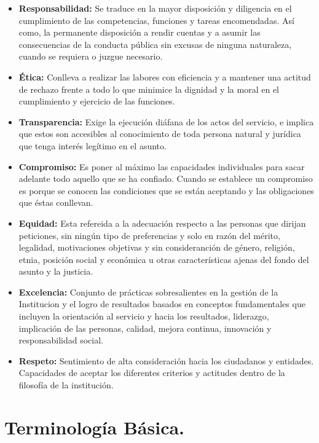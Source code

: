 \documentclass[]{article}
\providecommand{\tightlist}{%
  \setlength{\itemsep}{0pt}\setlength{\parskip}{0pt}}
\begin{document}
\begin{itemize}
\tightlist
\item
  \textbf{Responsabilidad:} Se traduce en la mayor disposición y
  diligencia en el cumplimiento de las competencias, funciones y tareas
  encomendadas. Así como, la permanente disposición a rendir cuentas y a
  asumir las consecuencias de la conducta pública sin excusas de ninguna
  naturaleza, cuando se requiera o juzgue necesario.
\item
  \textbf{Ética:} Conlleva a realizar las labores con eficiencia y a
  mantener una actitud de rechazo frente a todo lo que minimice la
  dignidad y la moral en el cumplimiento y ejercicio de las funciones.
\item
  \textbf{Transparencia:} Exige la ejecución diáfana de los actos del
  servicio, e implica que estos son accesibles al conocimiento de toda
  persona natural y jurídica que tenga interés legítimo en el asunto.
\item
  \textbf{Compromiso:} Es poner al máximo las capacidades individuales
  para sacar adelante todo aquello que se ha confiado. Cuando se
  establece un compromiso es porque se conocen las condiciones que se
  están aceptando y las obligaciones que éstas conllevan.
\item
  \textbf{Equidad:} Esta refereida a la adecuación respecto a las
  personas que dirijan peticiones, sin ningún tipo de preferencias y
  solo en razón del mérito, legalidad, motivaciones objetivas y sin
  consideranción de género, religión, etnia, posición social y económica
  u otras características ajenas del fondo del asunto y la justicia.
\item
  \textbf{Excelencia:} Conjunto de prácticas sobresalientes en la
  gestión de la Institucion y el logro de resultados basados en
  conceptos fundamentales que incluyen la orientación al servicio y
  hacia los resultados, liderazgo, implicación de las personas, calidad,
  mejora continua, innovación y responsabilidad social.
\item
  \textbf{Respeto:} Sentimiento de alta consideración hacia los
  ciudadanos y entidades. Capacidades de aceptar los diferentes
  criterios y actitudes dentro de la filosofía de la institución.
\end{itemize}

\hypertarget{terminologia-basica.}{%
\section{Terminología Básica.}\label{terminologia-basica.}}
\end{document}
